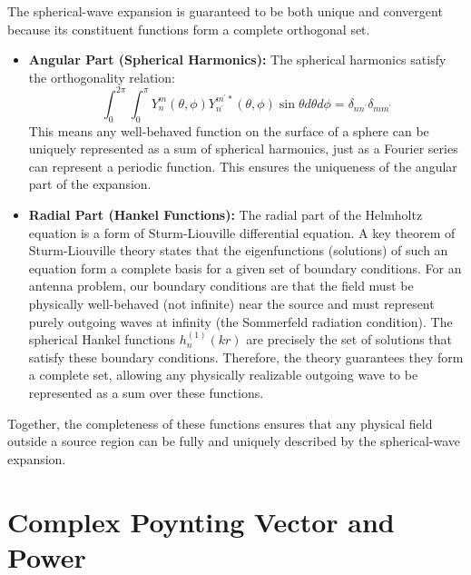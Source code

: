 \documentclass[11pt,a4paper]{article}
\begin{document}
The spherical-wave expansion is guaranteed to be both unique and convergent because its constituent functions form a complete orthogonal set.
\begin{itemize}
    \item \textbf{Angular Part (Spherical Harmonics):} The spherical harmonics satisfy the orthogonality relation:
    \begin{equation}
        \int_{0}^{2\pi}\int_{0}^{\pi}Y_{n}^{m}(\theta,\phi)Y_{n^{\prime}}^{m^{\prime}*}(\theta,\phi)\sin\theta d\theta d\phi=\delta_{nn^{\prime}}\delta_{mm^{\prime}}
    \end{equation}
    This means any well-behaved function on the surface of a sphere can be uniquely represented as a sum of spherical harmonics, just as a Fourier series can represent a periodic function. This ensures the uniqueness of the angular part of the expansion.
    
    \item \textbf{Radial Part (Hankel Functions):} The radial part of the Helmholtz equation is a form of Sturm-Liouville differential equation. A key theorem of Sturm-Liouville theory states that the eigenfunctions (solutions) of such an equation form a complete basis for a given set of boundary conditions. For an antenna problem, our boundary conditions are that the field must be physically well-behaved (not infinite) near the source and must represent purely outgoing waves at infinity (the Sommerfeld radiation condition). The spherical Hankel functions \(h_{n}^{(1)}(kr)\) are precisely the set of solutions that satisfy these boundary conditions. Therefore, the theory guarantees they form a complete set, allowing any physically realizable outgoing wave to be represented as a sum over these functions.
\end{itemize}
Together, the completeness of these functions ensures that any physical field outside a source region can be fully and uniquely described by the spherical-wave expansion.

\section{Complex Poynting Vector and Power}
\end{document}
